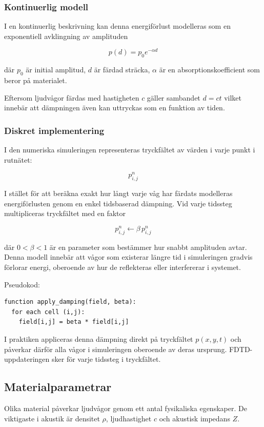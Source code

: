 \documentclass[11pt,a4paper]{article}
\begin{document}
\subsubsection{Kontinuerlig modell}
I en kontinuerlig beskrivning kan denna energiförlust modelleras
som en exponentiell avklingning av amplituden

\[
p(d) = p_0 e^{-\alpha d}
\]

där $p_0$ är initial amplitud, \quad $d$ är färdad sträcka, \quad
$\alpha$ är en absorptionskoefficient som beror på materialet.

Eftersom ljudvågor färdas med hastigheten $c$ gäller sambandet
$d = ct$ vilket innebär att dämpningen även kan uttryckas som 
en funktion av tiden.


\subsubsection{Diskret implementering}
I den numeriska simuleringen representeras tryckfältet av värden
i varje punkt i rutnätet:

\[
p_{i,j}^n
\]

I stället för att beräkna exakt hur långt varje våg har färdats
modelleras energiförlusten genom en enkel tidsbaserad dämpning.
Vid varje tidssteg multipliceras tryckfältet med en faktor

\[
p_{i,j}^n \leftarrow \beta\, p_{i,j}^n
\]

där $0 < \beta < 1$ är en parameter som bestämmer hur snabbt 
amplituden avtar. Denna modell innebär att vågor som existerar 
längre tid i simuleringen gradvis förlorar energi, oberoende 
av hur de reflekteras eller interfererar i systemet.

Pseudokod:
\begin{lstlisting}[style=pseudocode]
function apply_damping(field, beta):
  for each cell (i,j):
    field[i,j] = beta * field[i,j]
\end{lstlisting}

I praktiken appliceras denna dämpning direkt på tryckfältet 
$p(x,y,t)$ och påverkar därför alla vågor i simuleringen 
oberoende av deras ursprung. FDTD-uppdateringen sker för 
varje tidssteg i tryckfältet.


\subsection{Materialparametrar}
Olika material påverkar ljudvågor genom ett antal fysikaliska
egenskaper. De viktigaste i akustik är densitet $\rho$, 
ljudhastighet $c$ och akustisk impedans $Z$.
\end{document}

